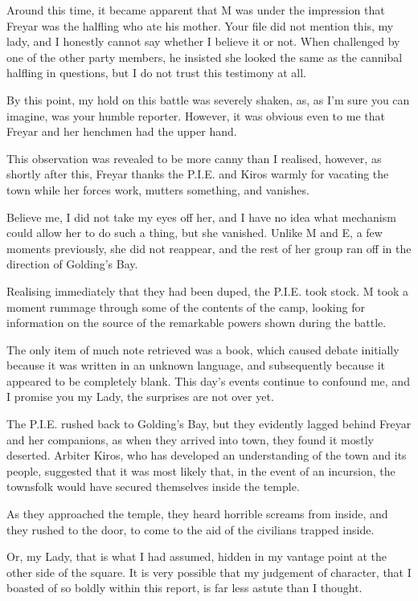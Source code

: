 Around this time, it became apparent that M was under the impression that Freyar was the halfling who ate his mother. Your file did not mention this, my lady, and I honestly cannot say whether I believe it or not. When challenged by one of the other party members, he insisted she looked the same as the cannibal halfling in questions, but I do not trust this testimony at all.\medskip

By this point, my hold on this battle was severely shaken, as, as I’m sure you can imagine, was your humble reporter. However, it was obvious even to me that Freyar and her henchmen had the upper hand.\medskip

This observation was revealed to be more canny than I realised, however, as shortly after this, Freyar thanks the P.I.E. and Kiros warmly for vacating the town while her forces work, mutters something, and vanishes.\medskip

Believe me, I did not take my eyes off her, and I have no idea what mechanism could allow her to do such a thing, but she vanished. Unlike M and E, a few moments previously, she did not reappear, and the rest of her group ran off in the direction of Golding’s Bay.\medskip

Realising immediately that they had been duped, the P.I.E. took stock. M took a moment rummage through some of the contents of the camp, looking for information on the source of the remarkable powers shown during the battle.\medskip

The only item of much note retrieved was a book, which caused debate initially because it was written in an unknown language, and subsequently because it appeared to be completely blank. This day’s events continue to confound me, and I promise you my Lady, the surprises are not over yet.\medskip

The P.I.E. rushed back to Golding’s Bay, but they evidently lagged behind Freyar and her companions, as when they arrived into town, they found it mostly deserted. Arbiter Kiros, who has developed an understanding of the town and its people, suggested that it was most likely that, in the event of an incursion, the townsfolk would have secured themselves inside the temple.\medskip

As they approached the temple, they heard horrible screams from inside, and they rushed to the door, to come to the aid of the civilians trapped inside.\medskip

Or, my Lady, that is what I had assumed, hidden in my vantage point at the other side of the square. It is very possible that my judgement of character, that I boasted of so boldly within this report, is far less astute than I thought.\medskip

